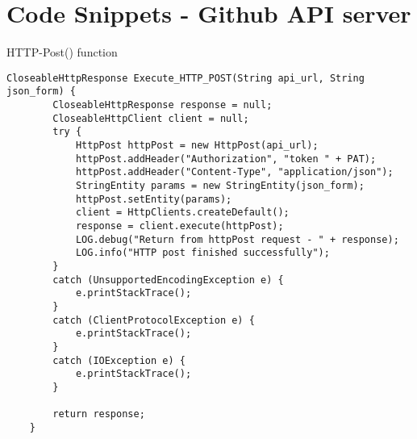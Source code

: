 \chapter{Code Snippets - Github API server} 
\label{AppendixA} 


HTTP-Post() function
\begin{lstlisting}[breaklines]
CloseableHttpResponse Execute_HTTP_POST(String api_url, String json_form) {
        CloseableHttpResponse response = null;
        CloseableHttpClient client = null;
        try {
            HttpPost httpPost = new HttpPost(api_url);
            httpPost.addHeader("Authorization", "token " + PAT);
            httpPost.addHeader("Content-Type", "application/json");
            StringEntity params = new StringEntity(json_form);
            httpPost.setEntity(params);
            client = HttpClients.createDefault();
            response = client.execute(httpPost);
            LOG.debug("Return from httpPost request - " + response);                      
            LOG.info("HTTP post finished successfully");
        }
        catch (UnsupportedEncodingException e) {
            e.printStackTrace();
        } 
        catch (ClientProtocolException e) {
            e.printStackTrace();
        } 
        catch (IOException e) {
            e.printStackTrace();
        }
   
        return response;
    }
\end{lstlisting}

